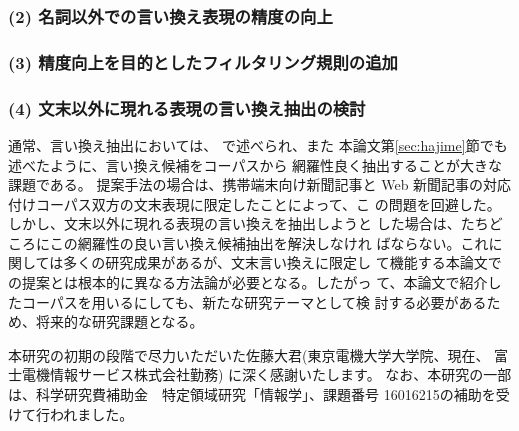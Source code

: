 \documentclass[jnlpbbl]{jnlp_j}
\begin{document}
\subsubsection*{(2) 名詞以外での言い換え表現の精度の向上}

\subsubsection*{(3) 精度向上を目的としたフィルタリング規則の追加}

\subsubsection*{(4) 文末以外に現れる表現の言い換え抽出の検討}

通常、言い換え抽出においては、\cite{inui02} で述べられ、また
本論文第\ref{sec:hajime}節でも述べたように、言い換え候補をコーパスから
網羅性良く抽出することが大きな課題である。
提案手法の場合は、携帯端末向け新聞記事と
Web 新聞記事の対応付けコーパス双方の文末表現に限定したことによって、こ
の問題を回避した。しかし、文末以外に現れる表現の言い換えを抽出しようと
した場合は、たちどころにこの網羅性の良い言い換え候補抽出を解決しなけれ
ばならない。これに関しては多くの研究成果があるが、文末言い換えに限定し
て機能する本論文での提案とは根本的に異なる方法論が必要となる。したがっ
て、本論文で紹介したコーパスを用いるにしても、新たな研究テーマとして検
討する必要があるため、将来的な研究課題となる。
\\


\acknowledgment
 
本研究の初期の段階で尽力いただいた佐藤大君(東京電機大学大学院、現在、
富士電機情報サービス株式会社勤務) に深く感謝いたします。
なお、本研究の一部は、科学研究費補助金　特定領域研究「情報学」、課題番号
16016215の補助を受けて行われました。
\end{document}
